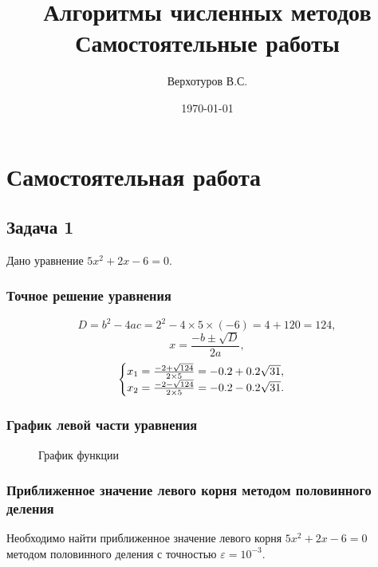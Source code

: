 \documentclass[10pt, a4paper, titlepage]{article}
\title{Алгоритмы численных методов \\ Самостоятельные работы}
\author{Верхотуров В.С.}
\affil{БСБО-05-20}
\affil{РТУ МИРЭА}
\date\today
\begin{document}
\maketitle

\section{Самостоятельная работа }

\subsection{Задача 1}

Дано уравнение $5x^2+2x-6=0$.

\subsubsection{Точное решение уравнения}
$$D=b^2-4ac=2^2-4\times5\times(-6)=4+120=124,$$
$$x=\frac{-b\pm\sqrt{D}}{2a},$$
\begin{equation*}
    \begin{cases}
        $$x_1=\frac{-2+\sqrt{124}}{2\times5}=-0.2+0.2\sqrt{31},$$ \\
        $$x_2=\frac{-2-\sqrt{124}}{2\times5}=-0.2-0.2\sqrt{31}.$$
    \end{cases}
\end{equation*} 

\subsubsection{График левой части уравнения}
\begin{figure}[h]
    \centering
    \caption{График функции}
    \label{sr1Task1Function}
\end{figure}

\subsubsection{Приближенное значение левого корня методом половинного деления}
Необходимо найти приближенное значение левого корня $5x^2+2x-6=0$ методом половинного деления с точностью $\varepsilon=10^{-3}$.
\end{document}
